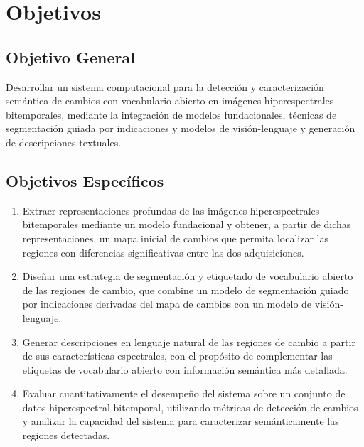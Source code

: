 \clearpage
\section{Objetivos}

\subsection{Objetivo General}

Desarrollar un sistema computacional para la detección y caracterización semántica de cambios con vocabulario abierto en imágenes hiperespectrales bitemporales, mediante la integración de modelos fundacionales, técnicas de segmentación guiada por indicaciones y modelos de visión-lenguaje y generación de descripciones textuales.

\subsection{Objetivos Específicos}

\begin{enumerate}[label=\arabic*., leftmargin=1.27cm]
  \item Extraer representaciones profundas de las imágenes hiperespectrales bitemporales mediante un modelo fundacional y obtener, a partir de dichas representaciones, un mapa inicial de cambios que permita localizar las regiones con diferencias significativas entre las dos adquisiciones.
  \item Diseñar una estrategia de segmentación y etiquetado de vocabulario abierto de las regiones de cambio, que combine un modelo de segmentación guiado por indicaciones derivadas del mapa de cambios con un modelo de visión-lenguaje.
  \item Generar descripciones en lenguaje natural de las regiones de cambio a partir de sus características espectrales, con el propósito de complementar las etiquetas de vocabulario abierto con información semántica más detallada.
  \item Evaluar cuantitativamente el desempeño del sistema sobre un conjunto de datos hiperespectral bitemporal, utilizando métricas de detección de cambios y analizar la capacidad del sistema para caracterizar semánticamente las regiones detectadas.
\end{enumerate}
